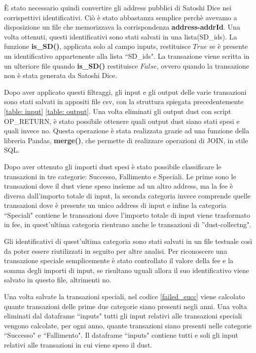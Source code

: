 È stato necessario quindi convertire gli address pubblici di Satoshi Dice nei corrispettivi identificativi. Ciò è stato abbastanza semplice perchè avevamo a disposizione un file che memorizzava la corrispondenza \textbf{address-addrId}. Una volta ottenuti, questi identificativi sono stati salvati in una lista(SD\_ids). La funzione \textbf{is\_SD()}, applicata solo al campo inputs, restituisce $True$ se è presente un identificativo appartenente alla lista ``SD\_ids". La transazione viene scritta in un ulteriore file quando \textbf{is\_SD()} restituisce $False$, ovvero quando la transazione non è stata generata da Satoshi Dice.

Dopo aver applicato questi filtraggi, gli input e gli output delle varie transazioni sono stati salvati in appositi file csv, con la struttura spiegata precedentemente \ref{table: input} \ref{table: output}. Una volta eliminati gli output dust con script OP\_RETURN, è stato possibile ottenere quali output dust siano stati spesi e quali invece no. Questa operazione è stata realizzata grazie ad una funzione della libreria Pandas, \textbf{merge()}, che permette di realizzare operazioni di JOIN, in stile SQL.

Dopo aver ottenuto gli importi dust spesi è stato possibile classificare le transazioni in tre categorie: Successo, Fallimento e Speciali. Le prime sono le transazioni dove il dust viene speso insieme ad un altro address, ma la fee è diversa dall'importo totale di input, la seconda categoria invece comprende quelle transazioni dove è presente un unico address di input e infine la categoria ``Speciali" contiene le transazioni dove l'importo totale di input viene trasformato in fee, in quest'ultima categoria rientrano anche le transazioni di ''dust-collectng". 

Gli identificativi di quest'ultima categoria sono stati salvati in un file testuale così da poter essere riutilizzati in seguito per altre analisi. Per riconoscere una transazione speciale semplicemente è stato controllato il valore della fee e la somma degli importi di input, se risultano uguali allora il suo identificativo viene salvato in questo file, altrimenti no.

Una volta salvate la transazioni speciali, nel codice \ref{failed_succ} viene calcolato quante transazioni delle prime due categorie siano presenti negli anni. Una volta eliminati dal dataframe ``inputs" tutti gli input relativi alle transazioni speciali vengono calcolate, per ogni anno, quante transazioni siano presenti nelle categorie ``Successo" e ``Fallimento". Il dataframe ``inputs" contiene tutti e soli gli input relativi alle transazioni in cui viene speso il dust. 

